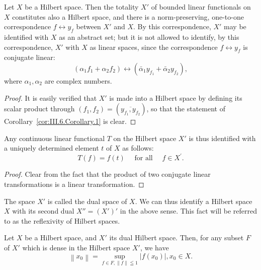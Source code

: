 \begin{corollary}\label{cor:III.6.Corollary.1} Let $X$ be a Hilbert space. Then the totality $X'$ of bounded linear functionals on $X$ constitutes also a Hilbert space, and there is a norm-preserving, one-to-one correspondence $f \leftrightarrow y_{f}$ between $X'$ and $X$. By this correspondence, $X'$ may be identified with $X$ as an abstract set; but it is not allowed to identify, by this correspondence, $X'$ with $X$ as linear spaces, since the correspondence $f \leftrightarrow y_{f}$ is conjugate linear: 
\begin{equation}\label{eq:III.6.4}
\left(\alpha_{1} f _{1} + \alpha_{2} f _{2}\right) \leftrightarrow \left(\bar {\alpha} _{1} y _ {f _{1}} + \bar {\alpha} _{2} y _ {f _{2}}\right),
\end{equation}
where $\alpha_{1},\alpha_{2}$ are complex numbers. 
\end{corollary}

\begin{proof}
 It is easily verified that $X'$ is made into a Hilbert space by defining its scalar product through $(f_1, f_2) = (\overline{y_{f_1}, y_{f_2}})$, so that the statement of Corollary~\ref{cor:III.6.Corollary.1} is clear. 
\end{proof}

\begin{corollary}\label{cor:III.6.Corollary.2} Any continuous linear functional $T$ on the Hilbert space $X'$ is thus identified with a uniquely determined element $t$ of $X$ as follows: 
\begin{equation}\label{eq:III.6.5}
T (f) = f (t) \quad \text{ for all } \quad f \in X ^{\prime}.
\end{equation}
\end{corollary}

\begin{proof}
 Clear from the fact that the product of two conjugate linear transformations is a linear transformation. 
\end{proof}

\begin{definitionu} The space $X'$ is called the dual space of $X$. We can thus identify a Hilbert space $X$ with its second dual $X'' = (X')'$ in the above sense. This fact will be referred to as the reflexivity of Hilbert spaces. 
\end{definitionu}

\begin{corollary}\label{cor:III.6.Corollary.3} Let $X$ be a Hilbert space, and $X'$ its dual Hilbert space. Then, for any subset $F$ of $X'$ which is dense in the Hilbert space $X'$, we have 
\begin{equation}\label{eq:III.6.6}
\left\| x _{0} \right\| = \sup\limits _{f \in F, \| f \| \leqq 1} \left| f (x _{0}) \right|, x _{0} \in X.
\end{equation}
\end{corollary}

